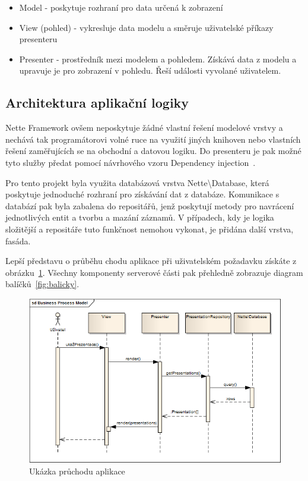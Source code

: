 \documentclass[11pt,twoside,a4paper]{book}
\begin{document}
\begin{itemize}
	\item Model - poskytuje rozhraní pro data určená k zobrazení
	\item View (pohled) - vykresluje data modelu a směruje uživatelské příkazy presenteru
	\item Presenter - prostředník mezi modelem a pohledem. Získává data z modelu a upravuje je pro zobrazení v pohledu. Řeší události vyvolané uživatelem.
\end{itemize}

\subsection{Architektura aplikační logiky}
Nette Framework ovšem neposkytuje žádné vlastní řešení modelové vrstvy a nechává tak programátorovi volné ruce na využití jiných knihoven nebo vlastních řešení zaměřujících se na obchodní a datovou logiku. Do presenteru je pak možné tyto služby předat pomocí návrhového vzoru Dependency injection~\cite{di}.

Pro tento projekt byla využita databázová vrstva Nette\textbackslash{}Database, která poskytuje jednoduché rozhraní pro získávání dat z databáze. Komunikace s databází pak byla zabalena do repositářů, jenž poskytují metody pro navrácení jednotlivých entit a tvorbu a mazání záznamů. V případech, kdy je logika složitější a repositáře tuto funkčnost nemohou vykonat, je přidána další vrstva, fasáda. 

Lepší představu o průběhu chodu aplikace při uživatelském požadavku získáte z obrázku~\ref{fig:logika}. Všechny komponenty serverové části pak přehledně zobrazuje diagram balíčků~\ref{fig:balicky}.


\begin{figure}[ht]
	\begin{center}
		\includegraphics[width=14cm]{PRO-img/logika.png}
		\caption{Ukázka průchodu aplikace}
		\label{fig:logika}
	\end{center}
\end{figure}
\end{document}
